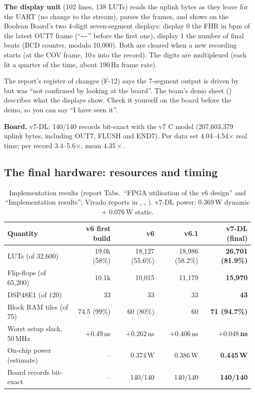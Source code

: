 \documentclass[11pt]{article}
\newcommand{\mods}[1]{\texttt{\detokenize{#1}}}   %
\begin{document}
\textbf{The display unit \mods{v7_disp}} (102 lines, 138 LUTs) reads the uplink bytes as they leave for the UART (no change to the stream), parses the frames, and shows on the Boolean Board's two 4-digit seven-segment displays: display 0 the FHR in bpm of the latest OUT7 frame (``\texttt{----}'' before the first one), display 1 the number of final beats (BCD counter, modulo 10,000). Both are cleared when a new recording starts (at the COV frame, 10\,s into the record). The digits are multiplexed (each lit a quarter of the time, about 190\,Hz frame rate).

\begin{warn}
The report's register of changes (F-12) says the 7-segment output is driven by \mods{v7_disp.v} but was ``not confirmed by looking at the board''. The team's demo sheet () describes what the displays show. Check it yourself on the board before the demo, so you can say ``I have seen it''.
\end{warn}

\textbf{Board.} v7-DL: 140/140 records bit-exact with the v7 C model (207,603,379 uplink bytes, including OUT7, FLUSH and END7). Per data set 4.04--4.54$\times$ real time; per record 3.4--5.6$\times$, mean $4.35\times$.

\subsection{The final hardware: resources and timing}
\begin{table}[H]
\centering\small
\begin{tabular}{@{}lrrrr@{}}
\toprule
\textbf{Quantity} & \textbf{v6 first build} & \textbf{v6} & \textbf{v6.1} & \textbf{v7-DL (final)} \\
\midrule
LUTs (of 32,600) & 19.0k (58\%) & 18,127 (55.6\%) & 18,986 (58.2\%) & \textbf{26,701 (81.9\%)} \\
Flip-flops (of 65,200) & 10.1k & 10,015 & 11,179 & \textbf{15,970} \\
DSP48E1 (of 120) & 33 & 33 & 33 & \textbf{43} \\
Block RAM tiles (of 75) & 74.5 (99\%) & 60 (80\%) & 60 & \textbf{71 (94.7\%)} \\
Worst setup slack, 50\,MHz & $+0.49$\,ns & $+0.262$\,ns & $+0.406$\,ns & $\mathbf{+0.048}$\,\textbf{ns} \\
On-chip power (estimate) & -- & 0.374\,W & 0.386\,W & \textbf{0.445\,W} \\
Board records bit-exact & -- & 140/140 & 140/140 & \textbf{140/140} \\
\bottomrule
\end{tabular}
\caption{Implementation results (report Tabs.\ ``FPGA utilisation of the v6 design'' and ``Implementation results''; Vivado reports in , , ). v7-DL power: 0.369\,W dynamic + 0.076\,W static.}
\end{table}
\end{document}

